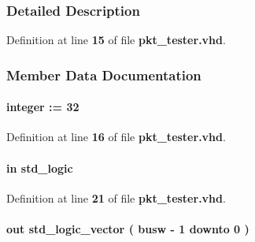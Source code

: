 \subsubsection{Detailed Description}


Definition at line {\bf 15} of file {\bf pkt\+\_\+tester.\+vhd}.



\subsubsection{Member Data Documentation}
\paragraph[{busw}]{ {\bfseries \textcolor{vhdlchar}{ }} {\bfseries \textcolor{comment}{integer}\textcolor{vhdlchar}{ }\textcolor{vhdlchar}{ }\textcolor{vhdlchar}{\+:}\textcolor{vhdlchar}{=}\textcolor{vhdlchar}{ }\textcolor{vhdlchar}{ } \textcolor{vhdldigit}{32} \textcolor{vhdlchar}{ }} \hspace{0.3cm}{\ttfamily [Generic]}}\label{classpkt__tester_aad61715062f88b71cbc35e70730661c1}


Definition at line {\bf 16} of file {\bf pkt\+\_\+tester.\+vhd}.

\paragraph[{clk}]{ {\bfseries \textcolor{keywordflow}{in}\textcolor{vhdlchar}{ }} {\bfseries \textcolor{comment}{std\+\_\+logic}\textcolor{vhdlchar}{ }} \hspace{0.3cm}{\ttfamily [Port]}}\label{classpkt__tester_a4a4609c199d30b3adebbeb3a01276ec5}


Definition at line {\bf 21} of file {\bf pkt\+\_\+tester.\+vhd}.

\paragraph[{data}]{ {\bfseries \textcolor{keywordflow}{out}\textcolor{vhdlchar}{ }} {\bfseries \textcolor{comment}{std\+\_\+logic\+\_\+vector}\textcolor{vhdlchar}{ }\textcolor{vhdlchar}{(}\textcolor{vhdlchar}{ }\textcolor{vhdlchar}{ }\textcolor{vhdlchar}{ }\textcolor{vhdlchar}{ }{\bfseries {\bf busw}} \textcolor{vhdlchar}{-\/}\textcolor{vhdlchar}{ } \textcolor{vhdldigit}{1} \textcolor{vhdlchar}{ }\textcolor{keywordflow}{downto}\textcolor{vhdlchar}{ }\textcolor{vhdlchar}{ } \textcolor{vhdldigit}{0} \textcolor{vhdlchar}{ }\textcolor{vhdlchar}{)}\textcolor{vhdlchar}{ }} \hspace{0.3cm}{\ttfamily [Port]}}\label{classpkt__tester_a433a5dacb551781638cc7ca248c5a998}


